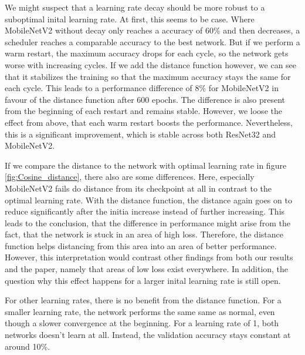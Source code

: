 We might suspect that a learning rate decay should be more robust to a
suboptimal inital learning rate. At first, this seems to be case. Where
MobileNetV2 without decay only reaches a accuracy of 60\% and then decreases, a
scheduler reaches a comparable accuracy to the best network. But if we perform a
warm restart, the maximum accuracy drops for each cycle, so the network gets
worse with increasing cycles. If we add the distance function however, we can
see that it stabilizes the training so that the maximum accuracy stays the same
for each cycle. This leads to a performance difference of 8\% for MobileNetV2 in
favour of the distance function after 600 epochs. The difference is also present
from the beginning of each restart and remains stable. However, we loose the
effect from above, that each warm restart boosts the performance. Nevertheless,
this is a significant improvement, which is stable across both ResNet32 and
MobileNetV2.

If we compare the distance to the network with optimal learning rate in figure
\ref{fig:Cosine_distance}, there also are some differences. Here, especially
MobileNetV2 fails do distance from its checkpoint at all in contrast to the
optimal learning rate. With the distance function, the distance again goes on to
reduce significantly after the initia increase instead of further increasing.
This leads to the conclusion, that the difference in performance might arise
from the fact, that the network is stuck in an area of high loss. Therefore, the
distance function helps distancing from this area into an area of better
performance. However, this interpretation would contrast other findings from
both our results and the paper, namely that areas of low loss exist everywhere.
In addition, the question why this effect happens for a larger inital learning
rate is still open.

For other learning rates, there is no benefit from the distance function. For a
smaller learning rate, the network performs the same same as normal, even though
a slower convergence at the beginning. For a learning rate of 1, both networks
doesn't learn at all. Instead, the validation accuracy stays constant at around
10\%.

